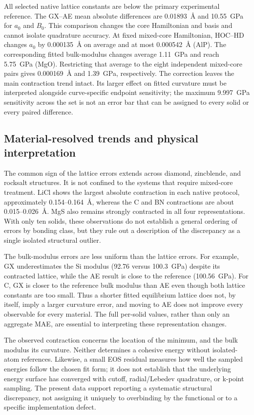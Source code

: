All selected native lattice constants are below the primary experimental reference. The GX--AE mean absolute differences are 0.01893~\AA{} and 10.55~GPa for $a_0$ and $B_0$. This comparison changes the core Hamiltonian and basis and cannot isolate quadrature accuracy. At fixed mixed-core Hamiltonian, HOC--HD changes $a_0$ by 0.000135~\AA{} on average and at most 0.000542~\AA{} (AlP). The corresponding fitted bulk-modulus changes average 1.11~GPa and reach 5.75~GPa (MgO). Restricting that average to the eight independent mixed-core pairs gives 0.000169~\AA{} and 1.39~GPa, respectively. The correction leaves the main contraction trend intact. Its larger effect on fitted curvature must be interpreted alongside curve-specific endpoint sensitivity; the maximum 9.997~GPa sensitivity across the set is not an error bar that can be assigned to every solid or every paired difference.

\subsection{Material-resolved trends and physical interpretation}

The common sign of the lattice errors extends across diamond, zincblende, and rocksalt structures. It is not confined to the systems that require mixed-core treatment. LiCl shows the largest absolute contraction in each native protocol, approximately 0.154--0.164~\AA{}, whereas the C and BN contractions are about 0.015--0.026~\AA{}. MgS also remains strongly contracted in all four representations. With only ten solids, these observations do not establish a general ordering of errors by bonding class, but they rule out a description of the discrepancy as a single isolated structural outlier.

The bulk-modulus errors are less uniform than the lattice errors. For example, GX underestimates the Si modulus (92.76 versus 100.3~GPa) despite its contracted lattice, while the AE result is close to the reference (100.56~GPa). For C, GX is closer to the reference bulk modulus than AE even though both lattice constants are too small. Thus a shorter fitted equilibrium lattice does not, by itself, imply a larger curvature error, and moving to AE does not improve every observable for every material. The full per-solid values, rather than only an aggregate MAE, are essential to interpreting these representation changes.

The observed contraction concerns the location of the minimum, and the bulk modulus its curvature. Neither determines a cohesive energy without isolated-atom references. Likewise, a small EOS residual measures how well the sampled energies follow the chosen fit form; it does not establish that the underlying energy surface has converged with cutoff, radial/Lebedev quadrature, or k-point sampling. The present data support reporting a systematic structural discrepancy, not assigning it uniquely to overbinding by the functional or to a specific implementation defect.


